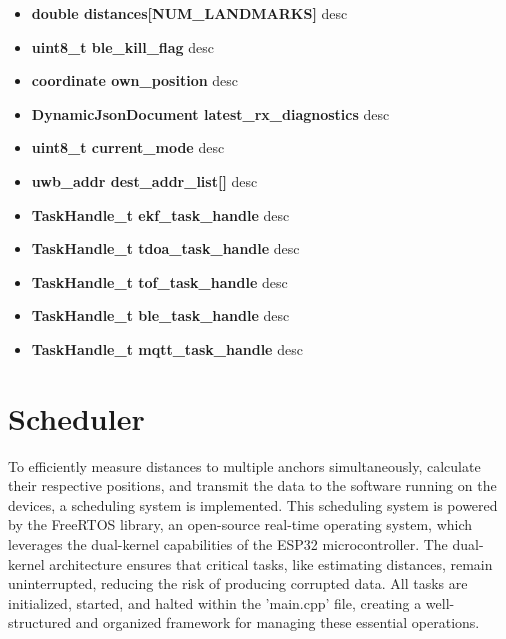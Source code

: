 \begin{itemize}
	\item \textbf{double distances[NUM\_LANDMARKS]}
	\newline
	desc
	
	\item \textbf{uint8\_t ble\_kill\_flag}
	\newline
	desc
	
	\item \textbf{coordinate own\_position}
	\newline
	desc
	
	\item \textbf{DynamicJsonDocument latest\_rx\_diagnostics}
	\newline
	desc
	
	\item \textbf{uint8\_t current\_mode}
	\newline
	desc
	
	\item \textbf{uwb\_addr dest\_addr\_list[]}
	\newline
	desc
	
	\item \textbf{TaskHandle\_t ekf\_task\_handle}
	\newline
	desc
	
	\item \textbf{TaskHandle\_t tdoa\_task\_handle}
	\newline
	desc
	
	\item \textbf{TaskHandle\_t tof\_task\_handle}
	\newline
	desc
	
	\item \textbf{TaskHandle\_t ble\_task\_handle}
	\newline
	desc
	
	\item \textbf{TaskHandle\_t mqtt\_task\_handle}
	\newline
	desc
\end{itemize}




\section{Scheduler}
To efficiently measure distances to multiple anchors simultaneously, calculate their respective positions, and transmit the data to the software running on the devices, a scheduling system is implemented. 
This scheduling system is powered by the FreeRTOS library, an open-source real-time operating system, which leverages the dual-kernel capabilities of the ESP32 microcontroller.
\vspace{4pt}
\newline
The dual-kernel architecture ensures that critical tasks, like estimating distances, remain uninterrupted, reducing the risk of producing corrupted data. 
All tasks are initialized, started, and halted within the 'main.cpp' file, creating a well-structured and organized framework for managing these essential operations.

